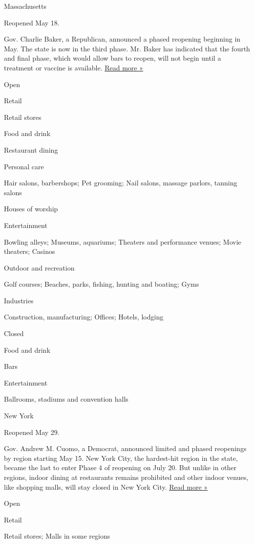 Massachusetts

Reopened May 18.

Gov. Charlie Baker, a Republican, announced a phased reopening beginning
in May. The state is now in the third phase. Mr. Baker has indicated
that the fourth and final phase, which would allow bars to reopen, will
not begin until a treatment or vaccine is available.
\href{https://www.nbcboston.com/news/coronavirus/for-phase-4-businesses-indefinite-wait-to-reopen-is-exceptionally-difficult/2159533/}{Read
more »}

Open

Retail

Retail stores

Food and drink

Restaurant dining

Personal care

Hair salons, barbershops; Pet grooming; Nail salons, massage parlors,
tanning salons

Houses of worship

Entertainment

Bowling alleys; Museums, aquariums; Theaters and performance venues;
Movie theaters; Casinos

Outdoor and recreation

Golf courses; Beaches, parks, fishing, hunting and boating; Gyms

Industries

Construction, manufacturing; Offices; Hotels, lodging

Closed

Food and drink

Bars

Entertainment

Ballrooms, stadiums and convention halls

New York

Reopened May 29.

Gov. Andrew M. Cuomo, a Democrat, announced limited and phased
reopenings by region starting May 15. New York City, the hardest-hit
region in the state, became the last to enter Phase 4 of reopening on
July 20. But unlike in other regions, indoor dining at restaurants
remains prohibited and other indoor venues, like shopping malls, will
stay closed in New York City.
\href{https://www.nytimes.com/2020/07/20/nyregion/nyc-phase-4-reopening-bars.html}{Read
more »}

Open

Retail

Retail stores; Malls in some regions

